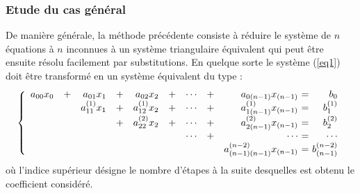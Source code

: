 \subsubsection*{Etude du cas général}
\label{casgeneral}
De manière générale, la méthode précédente consiste à réduire le système de $n$ 
équations à $n$ inconnues à un système triangulaire équivalent qui peut 
être ensuite résolu facilement par substitutions. En quelque sorte le système 
(\ref{eq1}) doit être transformé en un système équivalent du type :
\begin{equation}\label{eq2}
\left\{
\begin{array}{rcrcrcrcr@{\ =\ }r}
a_{00}x_0 &+& a_{01}x_1       &+& a_{02}x_2       &+& \cdots &+& a_{0(n-1)}x_{(n-1)}       & b_0\\
          & & a^{(1)}_{11}x_1 &+& a^{(1)}_{12}x_2 &+& \cdots &+& a^{(1)}_{1(n-1)}x_{(n-1)} & b^{(1)}_1\\
          & &                 &+& a^{(2)}_{22}x_2 &+& \cdots &+& a^{(2)}_{2(n-1)}x_{(n-1)} & b^{(2)}_2\\
          & &                 & &                 & & \cdots &+& \cdots           & \cdots\\
          & &                 & &                 & &        & & a^{(n-2)}_{(n-1)(n-1)}x_{(n-1)}   & b^{(n-2)}_{(n-1)}
\end{array}
\right.
\end{equation}
où l'indice supérieur désigne le nombre d'étapes à la suite desquelles est obtenu le 
coefficient considéré.

